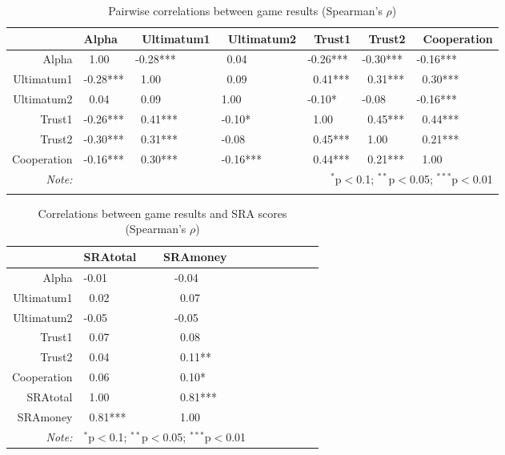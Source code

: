 \begin{table}[H] 
  \caption{Pairwise correlations between game results (Spearman\rq s \(\rho\))} 
  \label{} \centering
  \begin{tabular}{rllllll}
  \hline
 & Alpha &  \ Ultimatum1 & \ Ultimatum2 & \ Trust1 & \ Trust2 & \ Cooperation \\ 
  \hline
Alpha &   \ 1.00  & -0.28*** & \ 0.04  & -0.26*** & -0.30*** & -0.16*** \\ 
 Ultimatum1 & -0.28*** & \ 1.00  &  \ 0.09  & \ 0.41*** & \ 0.31*** &  \ 0.30*** \\ 
  Ultimatum2 &  \ 0.04  &  \ 0.09  &  1.00  & -0.10* & -0.08  & -0.16*** \\ 
  Trust1 & -0.26*** & \  0.41*** & -0.10* & \ 1.00  & \ 0.45*** &  \ 0.44*** \\ 
  Trust2 & -0.30*** &  \ 0.31*** & -0.08  &  \ 0.45*** & \ 1.00  &  \ 0.21*** \\ 
  Cooperation & -0.16*** &  \ 0.30*** & -0.16*** & \  0.44*** & \ 0.21*** &  \ 1.00  \\ 
   \hline
      \textit{Note:}  & \multicolumn{6}{r}{$^{*}$p$<$0.1; $^{**}$p$<$0.05; $^{***}$p$<$0.01} \\ 
      \newline
\vspace*{1.5 cm}
\newline
\end{tabular}
\end{table}


\begin{table}[H] \centering 
  \caption{Correlations between game results and SRA scores (Spearman\rq s \(\rho\))} 
  \label{} 
\centering
\begin{tabular}{rllllllll}
  \hline
 & SRAtotal & SRAmoney \\ 
  \hline
Alpha  & -0.01  & \ \ -0.04  \\ 
  Ultimatum1  &  \ 0.02  &  \ \ \ 0.07  \\ 
  Ultimatum2 & -0.05  & \ \ -0.05  \\ 
  Trust1 &  \ 0.07  &  \ \ \ 0.08  \\ 
  Trust2  &  \ 0.04  & \ \ \  0.11** \\ 
  Cooperation  & \  0.06  &  \ \ \ 0.10* \\ 
  SRAtotal &  \ 1.00  &  \ \ \ 0.81*** \\ 
  SRAmoney  &  \ 0.81*** &  \ \ \ 1.00  \\ 
   \hline
   \textit{Note:}  & \multicolumn{2}{r}{$^{*}$p$<$0.1; $^{**}$p$<$0.05; $^{***}$p$<$0.01} \\ 
\end{tabular}
\end{table}


